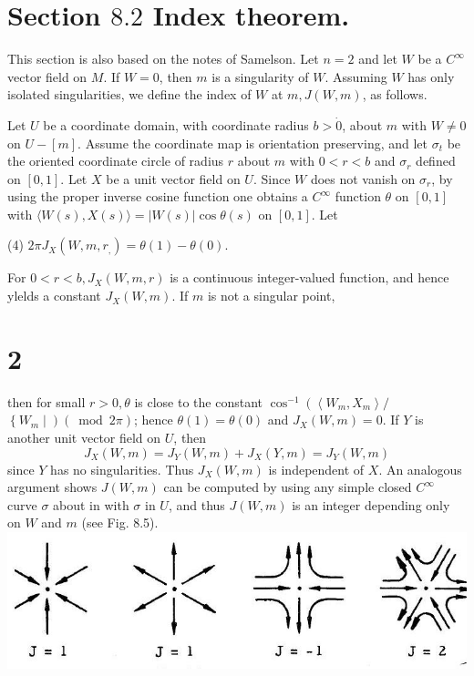\documentclass[10pt]{article}
\begin{document}
\section{Section $8.2$ Index theorem.}
This section is also based on the notes of Samelson. Let $n=2$ and let $W$ be a $C^{\infty}$ vector field on $M$. If $W=0$, then $m$ is a singularity of $W$. Assuming $W$ has only isolated singularities, we define the index of $W$ at $m, J(W, m)$, as follows.

Let $U$ be a coordinate domain, with coordinate radius $b>\dot{0}$, about $m$ with $W \neq 0$ on $U-[m]$. Assume the coordinate map is orientation preserving, and let $\sigma_{t}$ be the oriented coordinate circle of radius $r$ about $m$ with $0<r<b$ and $\sigma_{r}$ defined on $[0,1]$. Let $X$ be a unit vector field on $U$. Since $W$ does not vanish on $\sigma_{r}$, by using the proper inverse cosine function one obtains a $C^{\infty}$ function $\theta$ on $[0,1]$ with $\langle W(s), X(s)\rangle=|W(s)| \cos \theta(s)$ on $[0,1]$. Let

(4) $2 \pi J_{X}\left(W, m, r_{,}\right)=\theta(1)-\theta(0)$.

For $0<r<b, J_{X}(W, m, r)$ is a continuous integer-valued function, and hence ylelds a constant $J_{X}(W, m)$. If $m$ is not a singular point,

\section{2}
then for small $r>0, \theta$ is close to the constant $\cos ^{-1}\left(\left\langle W_{m}, X_{m}\right\rangle /\right.$ $\left\{W_{m} \mid\right)(\bmod 2 \pi)$; hence $\theta(1)=\theta(0)$ and $J_{X}(W, m)=0$. If $Y$ is another unit vector field on $U$, then
$$
J_{X}(W, m)=J_{Y}(W, m)+J_{X}(Y, m)=J_{Y}(W, m)
$$
since $Y$ has no singularities. Thus $J_{X}(W, m)$ is independent of $X$. An analogous argument shows $J(W, m)$ can be computed by using any simple closed $C^{\infty}$ curve $\sigma$ about in with $\sigma$ in $U$, and thus $J(W, m)$ is an integer depending only on $W$ and $m$ (see Fig. 8.5).\\

\includegraphics[max width=\textwidth]{2022_07_16_f4e476ee2159dc67e746g-60}
\end{document}
